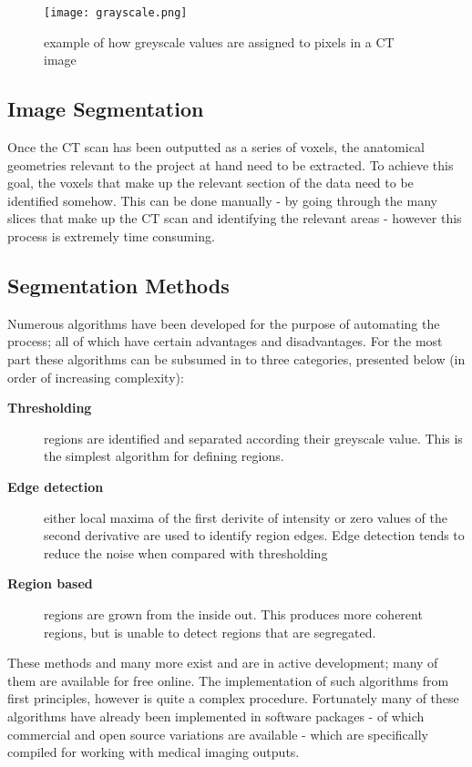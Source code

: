 \begin{figure} 
  \texttt{[image: grayscale.png]}
\caption{example of how greyscale values are assigned to pixels in a CT image} \label{fig:greyscale}
\centering
\end{figure}
 
\subsection{Image Segmentation} 

Once the CT scan has been outputted as a series of voxels, the anatomical geometries relevant to the project at hand need to be extracted. To achieve this goal, the voxels that make up the relevant section of the data need to be identified somehow. This can be done manually - by going through the many slices that make up the CT scan and identifying the relevant areas - however this process is extremely time consuming.

\subsection{Segmentation Methods}

Numerous algorithms have been developed for the purpose of automating the process; all of which have certain advantages and disadvantages. For the most part these algorithms can be subsumed in to three categories, presented below (in order of increasing complexity):

\begin{description}

  \item[\textbf{Thresholding}] regions are identified and separated according their  greyscale value. This is the simplest algorithm for defining regions.
 
  \item[\textbf{Edge detection}] either local maxima of the first derivite of intensity or zero values of the second derivative are used to identify region edges. Edge detection tends to reduce the noise when compared with thresholding
 
  \item[\textbf{Region based}] regions are grown from the inside out. This produces more coherent regions, but is unable to detect regions that are segregated.

\end{description}

These methods and many more exist and are in active development; many of them are available for free online. The implementation of such algorithms from first principles, however is quite a complex procedure. Fortunately many of these algorithms have already been implemented in software packages - of which commercial and open source variations are available - which are specifically compiled for working with medical imaging outputs. 
 
